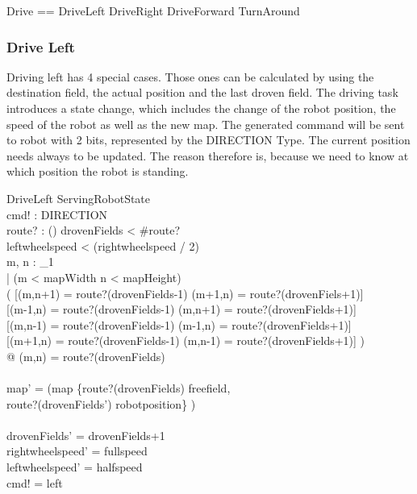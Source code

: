 \documentclass[11pt,a4paper]{article}
\begin{document}
\begin{zed}
Drive == DriveLeft \land DriveRight \land DriveForward \land TurnAround\newline
\end{zed}

\subsubsection{Drive Left}
Driving left has 4 special cases. Those ones can be calculated by using the destination field, the actual position and the last droven field. The driving task introduces a state change, which includes the change of the robot position, the speed of the robot as well as the new map. The generated command will be sent to robot with 2 bits, represented by the DIRECTION Type. The current position needs always to be updated. The reason therefore is, because we need to know at which position the robot is standing.

\begin{schema}{DriveLeft}
\Delta ServingRobotState\\
cmd! : DIRECTION\\
route? : \iseq (\nat \cross \nat)
\where
drovenFields < \#route?\\
leftwheelspeed < (rightwheelspeed / 2)\\
\forall m, n : \nat_1 \\
\hspace{20pt} | (m < mapWidth \land n < mapHeight) \land  \\
\hspace{30pt} ( \hspace{5pt} [(m,n+1) = route?(drovenFields-1) \land (m+1,n) = route?(drovenFiels+1)] \lor \\
\hspace{40pt}   [(m-1,n) = route?(drovenFields-1) \land (m,n+1) = route?(drovenFields+1)] \lor \\
\hspace{40pt}   [(m,n-1) = route?(drovenFields-1) \land (m-1,n) = route?(drovenFields+1)] \lor \\
\hspace{40pt}   [(m+1,n) = route?(drovenFields-1) \land (m,n-1) = route?(drovenFields+1)] \hspace{5pt} )\\
\hspace{30pt}@ (m,n) = route?(drovenFields)\\
\\
map' = (map \oplus \{route?(drovenFields) \mapsto freefield,\\ 
\hspace{85pt} route?(drovenFields') \mapsto robotposition\} ) \\\\

drovenFields' = drovenFields+1\\
rightwheelspeed' = fullspeed\\
leftwheelspeed' = halfspeed\\
cmd! = left
\end{schema}
\end{document}
